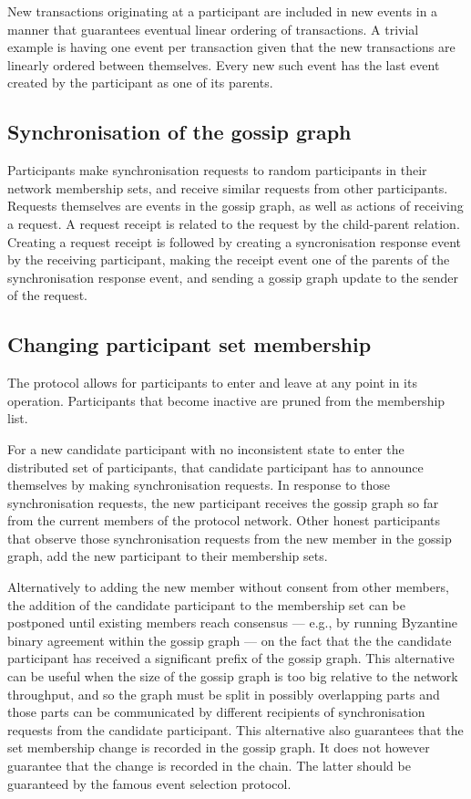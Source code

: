\documentclass[a4paper,11pt]{article}
\begin{document}
New transactions originating at a participant are included in new events in a manner that guarantees
eventual linear ordering of transactions. A trivial example is having one event per transaction
given that the new transactions are linearly ordered between themselves. Every new such event has
the last event created by the participant as one of its parents.


\subsection{Synchronisation of the gossip graph}

Participants make synchronisation requests to random participants in their network membership sets,
and receive similar requests from other participants. Requests themselves are events in the gossip
graph, as well as actions of receiving a request. A request receipt is related to the request by the
child-parent relation. Creating a request receipt is followed by creating a syncronisation response
event by the receiving participant, making the receipt event one of the parents of the
synchronisation response event, and sending a gossip graph update to the sender of the request.


\subsection{Changing participant set membership}

The protocol allows for participants to enter and leave at any point in its operation. Participants
that become inactive are pruned from the membership list.

For a new candidate participant with no inconsistent state to enter the distributed set of
participants, that candidate participant has to announce themselves by making synchronisation
requests. In response to those synchronisation requests, the new participant receives the gossip
graph so far from the current members of the protocol network. Other honest participants that
observe those synchronisation requests from the new member in the gossip graph, add the new
participant to their membership sets.

Alternatively to adding the new member without consent from other members, the addition of the
candidate participant to the membership set can be postponed until existing members reach consensus
--- e.g., by running Byzantine binary agreement within the gossip graph --- on the fact that the the
candidate participant has received a significant prefix of the gossip graph. This alternative can be
useful when the size of the gossip graph is too big relative to the network throughput, and so the
graph must be split in possibly overlapping parts and those parts can be communicated by different
recipients of synchronisation requests from the candidate participant. This alternative also
guarantees that the set membership change is recorded in the gossip graph. It does not however
guarantee that the change is recorded in the chain. The latter should be guaranteed by the famous
event selection protocol.
\end{document}
